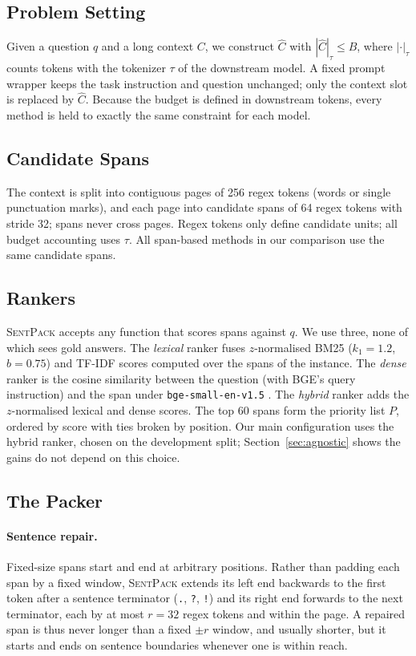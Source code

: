 \documentclass[11pt]{article}
\newcommand{\spk}{\textsc{SentPack}}
\begin{document}
\subsection{Problem Setting}
Given a question $q$ and a long context $C$, we construct $\hat C$ with $|\hat C|_{\tau}\le B$, where $|\cdot|_{\tau}$ counts tokens with the tokenizer $\tau$ of the downstream model. A fixed prompt wrapper keeps the task instruction and question unchanged; only the context slot is replaced by $\hat C$. Because the budget is defined in downstream tokens, every method is held to exactly the same constraint for each model.

\subsection{Candidate Spans}
The context is split into contiguous pages of 256 regex tokens (words or single punctuation marks), and each page into candidate spans of 64 regex tokens with stride 32; spans never cross pages. Regex tokens only define candidate units; all budget accounting uses $\tau$. All span-based methods in our comparison use the same candidate spans.

\subsection{Rankers}
\spk{} accepts any function that scores spans against $q$. We use three, none of which sees gold answers. The \emph{lexical} ranker fuses $z$-normalised BM25 ($k_1{=}1.2$, $b{=}0.75$) and TF-IDF scores computed over the spans of the instance. The \emph{dense} ranker is the cosine similarity between the question (with BGE's query instruction) and the span under \texttt{bge-small-en-v1.5} \citep{xiao2023cpack}. The \emph{hybrid} ranker adds the $z$-normalised lexical and dense scores. The top 60 spans form the priority list $P$, ordered by score with ties broken by position. Our main configuration uses the hybrid ranker, chosen on the development split; Section~\ref{sec:agnostic} shows the gains do not depend on this choice.

\subsection{The Packer}
\paragraph{Sentence repair.} Fixed-size spans start and end at arbitrary positions. Rather than padding each span by a fixed window, \spk{} extends its left end backwards to the first token after a sentence terminator (\texttt{.}, \texttt{?}, \texttt{!}) and its right end forwards to the next terminator, each by at most $r=32$ regex tokens and within the page. A repaired span is thus never longer than a fixed $\pm r$ window, and usually shorter, but it starts and ends on sentence boundaries whenever one is within reach.
\end{document}
